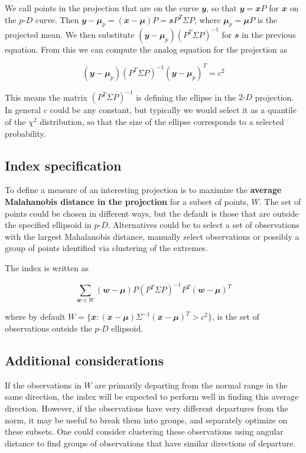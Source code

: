 \documentclass[
  12pt]{article}
\newcommand\pD{$p\text{-}D$}
\newcommand\gD{$2\text{-}D$}
\begin{document}
We call points in the projection that are on the curve \(\mathbfit{y}\), so that \(\mathbfit{y} = \mathbfit{x}P\)
for \(\mathbfit{x}\) on the \pD{} curve. Then
\(\mathbfit{y} - \mathbfit{\mu}_p = (\mathbfit{x} - \mathbfit{\mu})P = \mathbfit{s} P^T \Sigma P\), where 
\(\mathbfit{\mu}_p = \mathbfit{\mu} P\) is the projected mean. We then
substitute \((\mathbfit{y} - \mathbfit{\mu}_p) (P^T \Sigma P)^{-1}\) for \(\mathbfit{s}\) in the
previous equation. From this we
can compute the analog equation for the projection as

\[(\mathbfit{y} - \mathbfit{\mu}_p)(P^T \Sigma P)^{-1}(\mathbfit{y} - \mathbfit{\mu}_p)^T = c^2\]

This means the matrix \((P^T \Sigma P)^{-1}\) is defining the
ellipse in the \gD{} projection. In general \(c\) could be any constant,
but typically we would select it as a quantile of the \(\chi^2\)
distribution, so that the size of the ellipse corresponds to a selected
probability.

\subsection{Index specification}\label{index-specification}

To define a measure of an interesting projection is to maximize the
\textbf{average Malahanobis distance in the projection} for a subset of
points, \(W\). The set of points could be chosen in different ways, but
the default is those that are outside the specified ellipsoid in \pD{}.
Alternatives could be to select a set of observations with the largest
Mahalanobis distance, manually select observations or possibly a group
of points identified via clustering of the extremes.

The index is written as

\[
\sum_{\mathbfit{w} \in W} (\mathbfit{w} - \mathbfit{\mu}) P (P^T\Sigma P)^{-1}P^T(\mathbfit{w} - \mathbfit{\mu})^T
\]

where by default
\(W = \{\mathbfit{x}: (\mathbfit{x}-\mathbfit{\mu}) \Sigma^{-1}(\mathbfit{x}-\mathbfit{\mu})^T > c^2\}\),
is the set of observations outside the \pD{} ellipsoid.

\subsection{Additional considerations}\label{additional-considerations}

If the observations in \(W\) are primarily departing from the normal
range in the same direction, the index will be expected to perform well
in finding this average direction. However, if the observations have
very different departures from the norm, it may be useful to break them
into groups, and separately optimize on these subsets. One could
consider clustering these observations using angular distance to find
groups of observations that have similar directions of departure.
\end{document}
